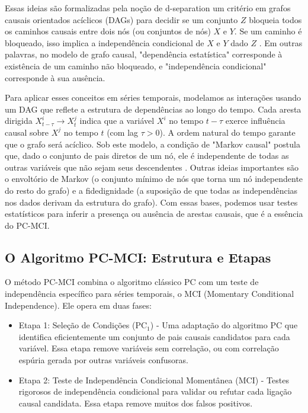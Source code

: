 \documentclass[12pt, a4paper]{article}
\begin{document}
Essas ideias são formalizadas pela noção de d-separation um critério em grafos causais orientados acíclicos (DAGs) para decidir se um conjunto $Z$ bloqueia todos os caminhos causais entre dois nós (ou conjuntos de nós) $X$ e $Y$. Se um caminho é bloqueado, isso implica a independência condicional de $X$ e $Y$ dado $Z$ \cite{pearl2009}. Em outras palavras, no modelo de grafo causal, "dependência estatística" corresponde à existência de um caminho não bloqueado, e "independência condicional" corresponde à sua ausência.

Para aplicar esses conceitos em séries temporais, modelamos as interações usando um DAG que reflete a estrutura de dependências ao longo do tempo. Cada aresta dirigida $X^i_{t - \tau} \to X^j_t$ indica que a variável $X^i$ no tempo $t-\tau$ exerce influência causal sobre $X^j$ no tempo $t$ (com lag $\tau > 0$). A ordem natural do tempo garante que o grafo será acíclico. Sob este modelo, a condição de "Markov causal" postula que, dado o conjunto de pais diretos de um nó, ele é independente de todas as outras variáveis que não sejam seus descendentes \cite{runge2018}. Outras ideias importantes são o envoltório de Markov (o conjunto mínimo de nós que torna um nó independente do resto do grafo) e a fidedignidade (a suposição de que todas as independências nos dados derivam da estrutura do grafo). Com essas bases, podemos usar testes estatísticos para inferir a presença ou ausência de arestas causais, que é a essência do PC-MCI.


\subsection*{O Algoritmo PC-MCI: Estrutura e Etapas}

O método PC-MCI combina o algoritmo clássico PC com um teste de independência específico para séries temporais, o MCI (Momentary Conditional Independence). Ele opera em duas fases:

\begin{itemize}
    \item Etapa 1: Seleção de Condições (PC$_1$) - Uma adaptação do algoritmo PC que identifica eficientemente um conjunto de pais causais candidatos para cada variável. Essa etapa remove variáveis sem correlação, ou com correlação espúria gerada por outras variáveis confusoras. 
    \item Etapa 2: Teste de Independência Condicional Momentânea (MCI) - Testes rigorosos de independência condicional para validar ou refutar cada ligação causal candidata. Essa etapa remove muitos dos falsos positivos. 
\end{itemize}
\end{document}
